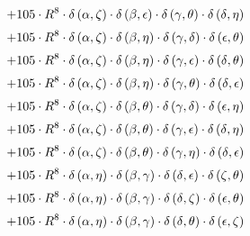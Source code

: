 \begin{subequations}
\begin{gather}
 \\[0.2em] \notag 		 + 105 \cdot R^{8} \cdot \delta{}\left(\alpha{}, \zeta{}\right) \cdot \delta{}\left(\beta{}, \epsilon{}\right) \cdot \delta{}\left(\gamma{}, \theta{}\right) \cdot \delta{}\left(\delta{}, \eta{}\right) 
 \\[0.2em] \notag 		 + 105 \cdot R^{8} \cdot \delta{}\left(\alpha{}, \zeta{}\right) \cdot \delta{}\left(\beta{}, \eta{}\right) \cdot \delta{}\left(\gamma{}, \delta{}\right) \cdot \delta{}\left(\epsilon{}, \theta{}\right) 
 \\[0.2em] \notag 		 + 105 \cdot R^{8} \cdot \delta{}\left(\alpha{}, \zeta{}\right) \cdot \delta{}\left(\beta{}, \eta{}\right) \cdot \delta{}\left(\gamma{}, \epsilon{}\right) \cdot \delta{}\left(\delta{}, \theta{}\right) 
 \\[0.2em] \notag 		 + 105 \cdot R^{8} \cdot \delta{}\left(\alpha{}, \zeta{}\right) \cdot \delta{}\left(\beta{}, \eta{}\right) \cdot \delta{}\left(\gamma{}, \theta{}\right) \cdot \delta{}\left(\delta{}, \epsilon{}\right) 
 \\[0.2em] \notag 		 + 105 \cdot R^{8} \cdot \delta{}\left(\alpha{}, \zeta{}\right) \cdot \delta{}\left(\beta{}, \theta{}\right) \cdot \delta{}\left(\gamma{}, \delta{}\right) \cdot \delta{}\left(\epsilon{}, \eta{}\right) 
 \\[0.2em] \notag 		 + 105 \cdot R^{8} \cdot \delta{}\left(\alpha{}, \zeta{}\right) \cdot \delta{}\left(\beta{}, \theta{}\right) \cdot \delta{}\left(\gamma{}, \epsilon{}\right) \cdot \delta{}\left(\delta{}, \eta{}\right) 
 \\[0.2em] \notag 		 + 105 \cdot R^{8} \cdot \delta{}\left(\alpha{}, \zeta{}\right) \cdot \delta{}\left(\beta{}, \theta{}\right) \cdot \delta{}\left(\gamma{}, \eta{}\right) \cdot \delta{}\left(\delta{}, \epsilon{}\right) 
 \\[0.2em] \notag 		 + 105 \cdot R^{8} \cdot \delta{}\left(\alpha{}, \eta{}\right) \cdot \delta{}\left(\beta{}, \gamma{}\right) \cdot \delta{}\left(\delta{}, \epsilon{}\right) \cdot \delta{}\left(\zeta{}, \theta{}\right) 
 \\[0.2em] \notag 		 + 105 \cdot R^{8} \cdot \delta{}\left(\alpha{}, \eta{}\right) \cdot \delta{}\left(\beta{}, \gamma{}\right) \cdot \delta{}\left(\delta{}, \zeta{}\right) \cdot \delta{}\left(\epsilon{}, \theta{}\right) 
 \\[0.2em] \notag 		 + 105 \cdot R^{8} \cdot \delta{}\left(\alpha{}, \eta{}\right) \cdot \delta{}\left(\beta{}, \gamma{}\right) \cdot \delta{}\left(\delta{}, \theta{}\right) \cdot \delta{}\left(\epsilon{}, \zeta{}\right) 

\end{gather}
\end{subequations}
